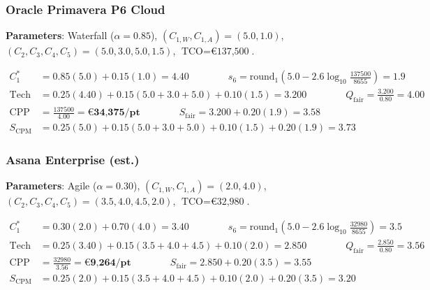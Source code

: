 \subsubsection{Oracle Primavera P6 Cloud}
\textbf{Parameters}: Waterfall ($\alpha = 0.85$), $(C_{1,W}, C_{1,A}) = (5.0, 1.0)$,\\ $(C_2, C_3, C_4, C_5) = (5.0, 3.0, 5.0, 1.5)$, $\text{TCO} = \text{€137,500}$.
\begin{small}
\begin{align*}
    C_1^* &= 0.85(5.0) + 0.15(1.0) = \mathbf{4.40} \qquad \qquad
    s_6 = \text{round}_1\!\left(5.0 - 2.6\log_{10}\!\tfrac{137500}{8655}\right) = \mathbf{1.9} \\
    \text{Tech} &= 0.25(4.40) + 0.15(5.0 + 3.0 + 5.0) + 0.10(1.5) = 3.200 \qquad \qquad
    Q_{\text{fair}} = \tfrac{3.200}{0.80} = \mathbf{4.00} \\
    \text{CPP} &= \tfrac{137500}{4.00} = \mathbf{\text{€34,375/pt}} \qquad \qquad
    S_{\text{fair}} = 3.200 + 0.20(1.9) = \mathbf{3.58} \\
    S_{\text{CPM}} &= 0.25(5.0) + 0.15(5.0 + 3.0 + 5.0) + 0.10(1.5) + 0.20(1.9) = \mathbf{3.73}
\end{align*}
\end{small}

\subsubsection{Asana Enterprise (est.)}
\textbf{Parameters}: Agile ($\alpha = 0.30$), $(C_{1,W}, C_{1,A}) = (2.0, 4.0)$, $(C_2, C_3, C_4, C_5) = (3.5, 4.0, 4.5, 2.0)$, $\text{TCO} = \text{€32,980}$.
\begin{small}
\begin{align*}
    C_1^* &= 0.30(2.0) + 0.70(4.0) = \mathbf{3.40} \qquad \qquad
    s_6 = \text{round}_1\!\left(5.0 - 2.6\log_{10}\!\tfrac{32980}{8655}\right) = \mathbf{3.5} \\
    \text{Tech} &= 0.25(3.40) + 0.15(3.5 + 4.0 + 4.5) + 0.10(2.0) = 2.850 \qquad \qquad
    Q_{\text{fair}} = \tfrac{2.850}{0.80} = \mathbf{3.56} \\
    \text{CPP} &= \tfrac{32980}{3.56} = \mathbf{\text{€9,264/pt}} \qquad \qquad
    S_{\text{fair}} = 2.850 + 0.20(3.5) = \mathbf{3.55} \\
    S_{\text{CPM}} &= 0.25(2.0) + 0.15(3.5 + 4.0 + 4.5) + 0.10(2.0) + 0.20(3.5) = \mathbf{3.20}
\end{align*}
\end{small}


